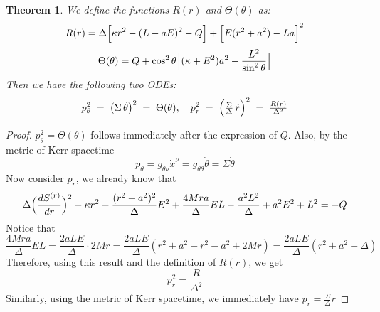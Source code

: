 \documentclass{article}
\newtheorem{theorem}{Theorem}[section]
\theoremstyle{remark}
\begin{document}
\begin{theorem}\label{thm:R}
We define the functions $R(r)$ and $\Theta(\theta)$ as:
    \begin{equation}
        R(r)=\Delta\Bigl[\kappa r^2-(L - aE)^2-Q\Bigr]
        +\Bigl[E(r^2 + a^2)-La\Bigr]^2
    \end{equation}
    \begin{equation}
        \Theta(\theta)=Q+\cos^2\theta
        \Bigl[(\kappa + E^2)a^2-\frac{L^2}{\sin^2\theta}\Bigr]
    \end{equation}
    Then we have the following two ODEs:
    \begin{equation}
        p_{\theta}^2 \;=\; \bigl(\Sigma\,\dot{\theta}\bigr)^2 \;=\; \Theta(\theta),
        \quad
        p_{r}^2 \;=\; \Bigl(\tfrac{\Sigma}{\Delta}\,\dot{r}\Bigr)^2 \;=\; \tfrac{R(r)}{\Delta^2}
    \end{equation}

\end{theorem}
\begin{proof}
    $p_{\theta}^2=\Theta(\theta)$ follows immediately after the expression of $Q$. Also, by the metric of Kerr spacetime
    \begin{equation}
        p_{\theta} = g_{\theta\nu}\dot{x}^{\nu}=g_{\theta\theta}\dot{\theta}=\Sigma \dot{\theta}
    \end{equation}
    Now consider $p_r$, we already know that
    \begin{equation}
    \Delta\Bigl(\frac{dS^{(r)}}{dr}\Bigr)^2
    -\kappa r^2
    -\frac{(r^2 + a^2)^2}{\Delta}E^2
    +\frac{4Mra}{\Delta}EL
    -\frac{a^2 L^2}{\Delta} +a^2 E^2 +L^2 = -Q
    \end{equation}
    Notice that 
    \begin{equation}
        \frac{4Mra}{\Delta}EL = \frac{2aLE}{\Delta}\cdot 2Mr= \frac{2aLE}{\Delta}(r^2+a^2-r^2-a^2+2Mr)= \frac{2aLE}{\Delta}(r^2+a^2-\Delta)
    \end{equation}
    Therefore, using this result and the definition of $R(r)$, we get
    \begin{equation}
        p_r^2 = \frac{R}{\Delta^2}
    \end{equation}
    Similarly, using the metric of Kerr spacetime, we immediately have $p_r=\frac{\Sigma}{\Delta}\dot{r}$
\end{proof}
\end{document}
